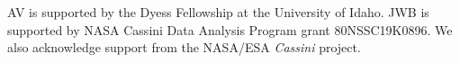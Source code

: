 \documentclass[tighten,linenumbers,twocolumn]{aastex631}
\begin{document}





\begin{acknowledgments}
AV is supported by the Dyess Fellowship at the University of Idaho. JWB is supported by NASA Cassini Data Analysis Program grant 80NSSC19K0896. We also acknowledge support from the NASA/ESA \emph{Cassini} project.
\end{acknowledgments}



\end{document}
